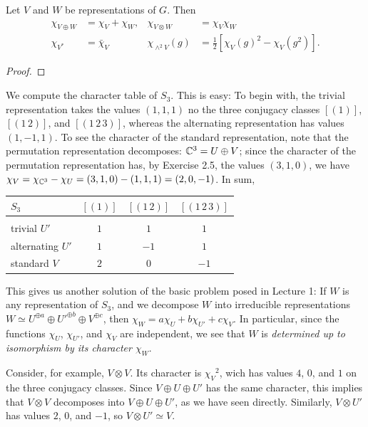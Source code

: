 \begin{proposition}
Let $V$ and $W$ be representations of $G$. Then
\[
  \begin{aligned}
    \chi_{V\oplus W}&=\chi_V+\chi_W,&\chi_{V\otimes W}&=\chi_V\chi_W\\
    \chi_{V^*}&=\bar\chi_V&\chi_{\wedge^2
      V}(g)&=\tfrac{1}{2}\left[\chi_V(g)^2-\chi_V(g^2)\right].
  \end{aligned}
\]
\end{proposition}
\begin{proof}
\end{proof}
\begin{example}
We compute the character table of $S_3$. This is easy: To begin with, the
trivial representation takes the values $(1,1,1)$ no the three conjugacy
classes $[(1)]$, $[(1\,2)]$, and $[(1\,2\,3)]$, whereas the alternating
representation has values $(1,-1,1)$. To see the character of the standard
representation, note that the permutation representation decomposes:
$\mathbb{C}^3=U\oplus V$; since the character of the permutation representation
has, by Exercise 2.5, the values $(3,1,0)$, we have
$\chi_V=\chi_{\mathbb{C}^3}-\chi_U=(3,1,0)-(1,1,1)=(2,0,-1)$. In sum,
\begin{center}
  \begin{tabular}{l|ccc}
    $S_3$&$[(1)]$&$[(1\,2)]$&$[(1\,2\,3)]$\\
    \hline\\
    trivial $U'$&$1$&$1$&$1$\\
    alternating $U'$&$1$&$-1$&$1$\\
    standard $V$&$2$&$0$&$-1$
  \end{tabular}
\end{center}
\end{example}

This gives us another solution of the basic problem posed in Lecture 1: If
$W$ is any representation of $S_3$, and we decompose $W$ into irreducible
representations $W\simeq U^{\oplus a}\oplus {U'}^{\oplus b}\oplus V^{\oplus
c}$, then $\chi_W=a\chi_U+b\chi_{U'}+c\chi_V$. In particular, since the
functions $\chi_U$, $\chi_{U'}$, and $\chi_V$ are independent, we see that
$W$ is \emph{determined up to isomorphism by its character $\chi_W$}.

Consider, for example, $V\otimes V$. Its character is ${\chi_V}^2$, wich
has values $4$, $0$, and $1$ on the three conjugacy classes. Since $V\oplus
U\oplus U'$ has the same character, this implies that $V\otimes V$
decomposes into $V\oplus U\oplus U'$, as we have seen directly. Similarly,
$V\otimes U'$ has values $2$, $0$, and $-1$, so $V\otimes U'\simeq V$.


